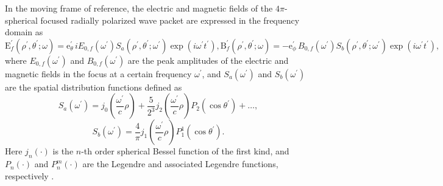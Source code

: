 \documentclass[10pt, a4paper, twoside, openright]{report}
\renewcommand{\vec}[1]{\boldsymbol{\mathrm{#1}}}
\begin{document}
In the moving frame of reference, the electric and magnetic fields of the $ 4 \pi $-spherical focused radially polarized wave packet are expressed in the frequency domain as \cite{Jeong2020, Jeong2021}
\begin{subequations}
\begin{equation}\label{eq:E_field_4pi}
\vec{E}^{\prime}_{f} \left( \rho^{\prime}, \theta^{\prime}; \omega \right) = \vec{e}_{\theta}^{\prime} \, i E_{0, f} \left( \omega^{\prime} \right) S_a \left( \rho^{\prime}, \theta^{\prime}; \omega^{\prime} \right) \exp \left(i \omega^{\prime} t^{\prime} \right),
\end{equation}
\begin{equation}\label{eq:B_field_4pi}
\vec{B}^{\prime}_{f} \left( \rho^{\prime}, \theta^{\prime}; \omega \right) = - \vec{e}_{\phi}^{\prime} \, B_{0, f} \left( \omega^{\prime} \right) S_b \left( \rho^{\prime}, \theta^{\prime}; \omega^{\prime} \right) \exp \left(i \omega^{\prime} t^{\prime} \right),
\end{equation}
\end{subequations}
where $ E_{0, f} \left( \omega^{\prime} \right) $ and $ B_{0, f} \left( \omega^{\prime} \right) $ are the peak amplitudes of the electric and magnetic fields in the focus at a certain frequency $ \omega^{\prime} $, and $ S_a \left( \omega^{\prime} \right) $ and $ S_b \left( \omega^{\prime} \right) $ are the spatial distribution functions defined as \cite{Jeong2020, Jeong2021}
\begin{equation}\label{eq:S_a}
S_a \left( \omega^{\prime} \right) = j_0 \left( \frac{\omega^{\prime}}{c} \rho \right) + \frac{5}{2^3} j_2 \left( \frac{\omega^{\prime}}{c} \rho \right) P_2 \left( \cos \theta^{\prime} \right) + \dots,
\end{equation}
\begin{equation}\label{eq:S_b}
S_b \left( \omega^{\prime} \right) = \frac{4}{\pi} j_1 \left( \frac{\omega^{\prime}}{c} \rho \right) P^1_1 \left( \cos \theta^{\prime} \right).
\end{equation}
Here $ j_{n} \left( \cdot \right) $ is the $ n $-th order spherical Bessel function of the first kind, and $ P_n \left( \cdot \right) $ and $ P^m_n \left( \cdot \right) $ are the Legendre and associated Legendre functions, respectively \cite{Gradshteyn1965}.
\end{document}
